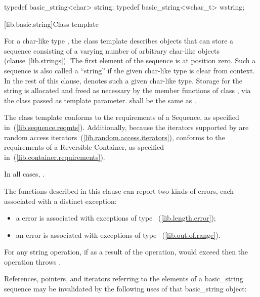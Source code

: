 \begin{codeblock}
{  typedef basic_string<char> string;
  typedef basic_string<wchar_t> wstring;
}
\end{codeblock}

[lib.basic.string]{Class template }

\pnum
{}%
For a char-like type , the class template 
describes objects that can store a sequence consisting of a varying number of
arbitrary char-like objects (clause~\ref{lib.strings}).
The first element of the sequence is at position zero.
Such a sequence is also called a ``string'' if the given char-like type
is clear from context. In the rest of this clause,  denotes
such a given char-like type. Storage for the string is allocated and freed
as necessary by the member functions of class , via the
 class passed as template parameter.
 shall be the same as .

\pnum
The class template  conforms to the requirements of a
Sequence, as specified in~(\ref{lib.sequence.reqmts}).
Additionally, because the iterators supported by  are
random access iterators~(\ref{lib.random.access.iterators}),
 conforms to the requirements of a Reversible Container,
as specified in~(\ref{lib.container.requirements}).

\pnum
In all cases,
.

\pnum
The functions described in this clause can report two
kinds of errors, each associated with a distinct exception:

\begin{itemize}
\item
a
error is associated with exceptions of type
~(\ref{lib.length.error});
%
\item
an
error is associated with exceptions of type
~(\ref{lib.out.of.range}).
%
\end{itemize}

\pnumalt
For any string operation, if as a result of the operation, 
would exceed  then the operation throws .

\pnum
References, pointers, and iterators referring to the elements of a basic_string
sequence may be invalidated by the following uses of that basic_string object:

